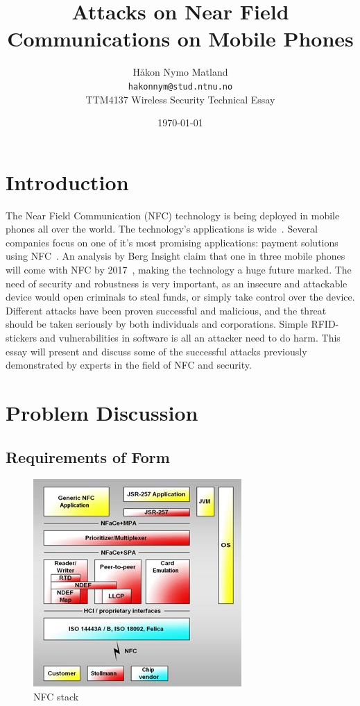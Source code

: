 \documentclass[a4paper,11pt]{article}
\title{Attacks on Near Field Communications on Mobile Phones}
\author{Håkon Nymo Matland \\
	\texttt{hakonnym@stud.ntnu.no}\\
	TTM4137 Wireless Security Technical Essay}
\date{\today}
\begin{document}
\maketitle

\section{Introduction}
The Near Field Communication (NFC) technology is being deployed in mobile phones all over the world. The technology's applications is wide~\cite{remedios2006nfc}. Several companies focus on one of it's most promising applications: payment solutions using NFC~\cite{tan2013}. An analysis by Berg Insight claim that one in three mobile phones will come with NFC by 2017~\cite{nfc_growth}, making the technology a huge future marked.
The need of security and robustness is very important, as an insecure and attackable device would open criminals to steal funds, or simply take control over the device. Different attacks have been proven successful and malicious, and the threat should be taken seriously by both individuals and corporations. Simple RFID-stickers and vulnerabilities in software is all an attacker need to do harm. This essay will present and discuss some of the successful attacks previously demonstrated by experts in the field of NFC and security.


\section{Problem Discussion}

\subsection{Requirements of Form}

\begin{figure}
  \centering
  \includegraphics[scale=0.2]{nfc_stack} %
  \vspace{-0.2cm}
  \caption{NFC stack}
  \label{fig:nfc_stack}
\end{figure}
\end{document}
